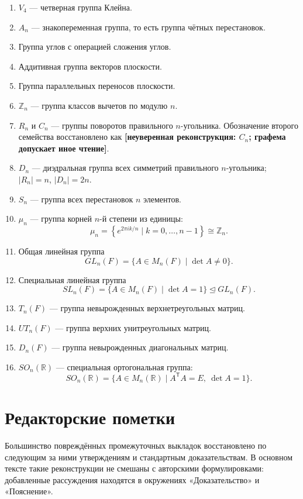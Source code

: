 \documentclass[12pt,a4paper,oneside,openany]{book}
\theoremstyle{definition}
\theoremstyle{plain}
\theoremstyle{remark}
\newcommand{\Z}{\mathbb{Z}}
\newcommand{\R}{\mathbb{R}}
\newcommand{\uncertain}[1]{%
  \textcolor{editorred}{\textbf{[неуверенная реконструкция: #1]}}}
\begin{document}
\begin{enumerate}
  \item $V_4$ --- четверная группа Клейна.
  \item $A_n$ --- знакопеременная группа, то есть группа чётных
  перестановок.
  \item Группа углов с операцией сложения углов.
  \item Аддитивная группа векторов плоскости.
  \item Группа параллельных переносов плоскости.
  \item $\Z_n$ --- группа классов вычетов по модулю $n$.
  \item $R_n$ и $C_n$ --- группы поворотов правильного $n$-угольника.
  Обозначение второго семейства восстановлено как
  \uncertain{$C_n$; графема допускает иное чтение}.
  \item $D_n$ --- диэдральная группа всех симметрий правильного
  $n$-угольника; $|R_n|=n$, $|D_n|=2n$.
  \item $S_n$ --- группа всех перестановок $n$ элементов.
  \item $\mu_n$ --- группа корней $n$-й степени из единицы:
  \[
    \mu_n=\left\{e^{2\pi i k/n}\mid k=0,\ldots,n-1\right\}
    \cong\Z_n.
  \]
  \item Общая линейная группа
  \[
    GL_n(F)=\{A\in M_n(F)\mid\det A\ne0\}.
  \]
  \item Специальная линейная группа
  \[
    SL_n(F)=\{A\in M_n(F)\mid\det A=1\}
    \trianglelefteq GL_n(F).
  \]
  \item $T_n(F)$ --- группа невырожденных верхнетреугольных матриц.
  \item $UT_n(F)$ --- группа верхних унитреугольных матриц.
  \item $D_n(F)$ --- группа невырожденных диагональных матриц.
  \item $SO_n(\R)$ --- специальная ортогональная группа:
  \[
    SO_n(\R)=\{A\in M_n(\R)\mid A^{\mathsf T}A=E,\ \det A=1\}.
  \]
\end{enumerate}


\appendix
\chapter{Редакторские пометки}

Большинство повреждённых промежуточных выкладок восстановлено по
следующим за ними утверждениям и стандартным доказательствам. В основном
тексте такие реконструкции не смешаны с авторскими формулировками:
добавленные рассуждения находятся в окружениях «Доказательство» и
«Пояснение».
\end{document}
